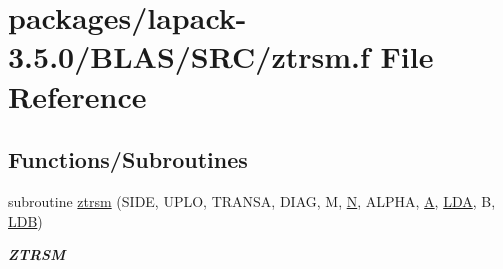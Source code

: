 \hypertarget{lapack-3_85_80_2BLAS_2SRC_2ztrsm_8f}{}\section{packages/lapack-\/3.5.0/\+B\+L\+A\+S/\+S\+R\+C/ztrsm.f File Reference}
\label{lapack-3_85_80_2BLAS_2SRC_2ztrsm_8f}
\subsection*{Functions/\+Subroutines}
\begin{DoxyCompactItemize}
\item 
subroutine \hyperlink{group__complex16__blas__level3_gac571a0a6d43e969990456d0676edb786}{ztrsm} (S\+I\+D\+E, U\+P\+L\+O, T\+R\+A\+N\+S\+A, D\+I\+A\+G, M, \hyperlink{polmisc_8c_a0240ac851181b84ac374872dc5434ee4}{N}, A\+L\+P\+H\+A, \hyperlink{classA}{A}, \hyperlink{example__user_8c_ae946da542ce0db94dced19b2ecefd1aa}{L\+D\+A}, B, \hyperlink{example__user_8c_a50e90a7104df172b5a89a06c47fcca04}{L\+D\+B})
\begin{DoxyCompactList}\small\item\em {\bfseries Z\+T\+R\+S\+M} \end{DoxyCompactList}\end{DoxyCompactItemize}
